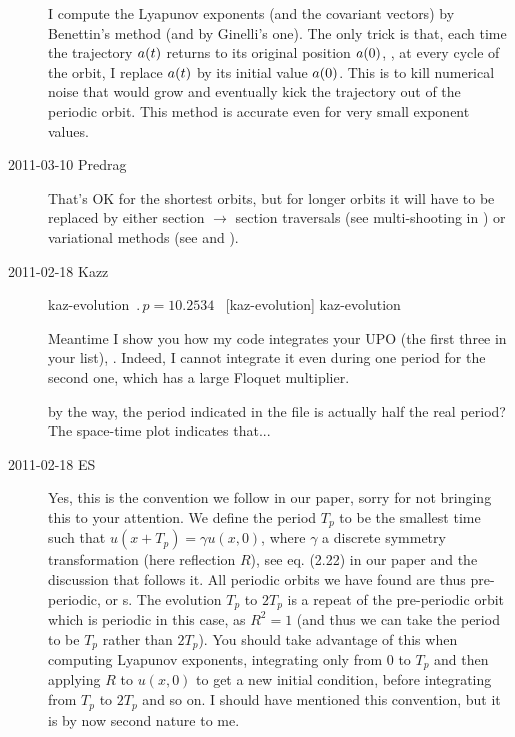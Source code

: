 \begin{description}
I compute the Lyapunov exponents (and the covariant vectors) 
by Benettin's method (and by Ginelli's one). The only trick is that, each time
the trajectory $\ssp(t)$ returns to its original position $\ssp(0)$, \ie, at every cycle
of the orbit, I replace $\ssp(t)$ by its initial value $\ssp(0)$. This is to kill
numerical noise that would grow and eventually kick the trajectory
out of the periodic orbit. This method is accurate even for very small
exponent values.

\renewcommand{\ssp}{a}

\item[2011-03-10 Predrag] That's OK for the shortest orbits, but
for longer orbits it will have to be replaced by either section $\to$
section traversals (see multi-shooting in 
) or variational methods (see
 and 
).

\item[2011-02-18 Kazz]

{kaz-evolution}   %
{}   %
{    %
$\period{p}=10.2534$ \po\ [kaz-evolution]
}
{kaz-evolution}   %


Meantime I show you how my code integrates your UPO (the first three in your
list), . Indeed, I cannot integrate
it even during one period for the second one, which has a large
Floquet multiplier.

by the way, the period indicated in the file is actually half the real period?
The space-time plot indicates that...

\item[2011-02-18 ES]

Yes, this is the convention we follow in our paper, sorry for not
bringing this to your attention. We define the period $T_p$ to be the
smallest time such that $u(x+T_p)=\gamma u(x,0)$, where $\gamma$ a
discrete symmetry transformation (here reflection $R$), see eq. (2.22) in
our paper and the discussion that follows it. All periodic orbits we
have found are thus pre-periodic, or \rpo s.
The evolution
$T_p$ to $2T_p$ is a repeat of the pre-periodic orbit which
is periodic in this case, as $R^2=1$ (and thus we can take the period to be $T_p$
rather than $2T_p$). You should take advantage of this
when computing Lyapunov exponents, integrating only from $0$ to $T_p$ and
then applying $R$ to $u(x,0)$ to get a new initial condition, before
integrating from $T_p$ to $2T_p$ and so on. I should have mentioned this
convention, but it is by now second nature to me.


\end{description}
